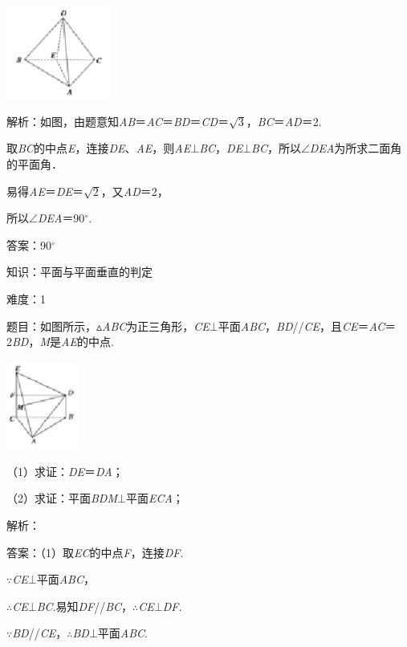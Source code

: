 \documentclass{article} %
\begin{document}
\includegraphics*[width=1.35in, height=1.21in, keepaspectratio=false]{image214}

解析：如图，由题意知\textit{AB}＝\textit{AC}＝\textit{BD}＝\textit{CD}＝$\sqrt{3}$，\textit{BC}＝\textit{AD}＝2.

取\textit{BC}的中点\textit{E}，连接\textit{DE}、\textit{AE}，则\textit{AE}$\mathrm{\bot}$\textit{BC}，\textit{DE}$\mathrm{\bot}$\textit{BC}，所以$\mathrm{\angle}$\textit{DEA}为所求二面角的平面角．

易得\textit{AE}＝\textit{DE}＝$\sqrt{2}$，又\textit{AD}＝2，

所以$\mathrm{\angle}$\textit{DEA}＝90$\mathrm{{}^\circ}$.

答案：90$\mathrm{{}^\circ}$

知识：平面与平面垂直的判定

难度：1

题目：如图所示，$\mathrm{\vartriangle}$\textit{ABC}为正三角形，\textit{CE}$\mathrm{\bot}$平面\textit{ABC}，\textit{BD}//\textit{CE}，且\textit{CE}＝\textit{AC}＝2\textit{BD}，\textit{M}是\textit{AE}的中点.

\includegraphics*[width=0.93in, height=1.14in, keepaspectratio=false]{image215}

（1）求证：\textit{DE}＝\textit{DA}；

（2）求证：平面\textit{BDM}$\mathrm{\bot}$平面\textit{ECA}；

解析：

答案：（1）取\textit{EC}的中点\textit{F}，连接\textit{DF}.

$\mathrm{\because}$\textit{CE}$\mathrm{\bot}$平面\textit{ABC}，

$\mathrm{\therefore}$\textit{CE}$\mathrm{\bot}$\textit{BC}.易知\textit{DF}//\textit{BC}，$\mathrm{\therefore}$\textit{CE}$\mathrm{\bot}$\textit{DF}.

$\mathrm{\because}$\textit{BD}//\textit{CE}，$\mathrm{\therefore}$\textit{BD}$\mathrm{\bot}$平面\textit{ABC}.
\end{document}
